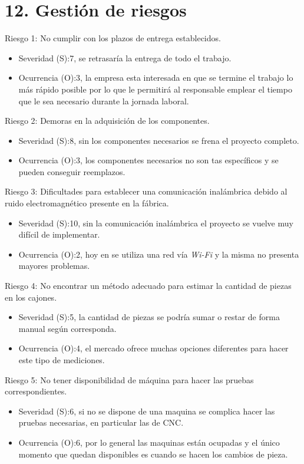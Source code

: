\documentclass[11pt]{charter}
\begin{document}
\section{12. Gestión de riesgos}
\label{sec:riesgos}

Riesgo 1: No cumplir con los plazos de entrega establecidos.
\begin{itemize}
    \item Severidad (S):7, se retrasaría la entrega de todo el trabajo.
    \item Ocurrencia (O):3, la empresa esta interesada en que se termine el trabajo lo más rápido posible por lo que le permitirá al responsable emplear el tiempo que le sea necesario durante la jornada laboral.
\end{itemize}

Riesgo 2: Demoras en la adquisición de los componentes.
\begin{itemize}
    \item Severidad (S):8, sin los componentes necesarios se frena el proyecto completo.
    \item Ocurrencia (O):3, los componentes necesarios no son tas específicos y se pueden conseguir reemplazos. 
\end{itemize}
Riesgo 3: Dificultades para establecer una comunicación inalámbrica debido al ruido electromagnético presente en la fábrica.
\begin{itemize}
    \item Severidad (S):10, sin la comunicación inalámbrica el proyecto se vuelve muy difícil de implementar.  
    \item Ocurrencia (O):2, hoy en se utiliza una red vía \textit{Wi-Fi} y la misma no presenta mayores problemas.
\end{itemize}
Riesgo 4: No encontrar un método adecuado para estimar la cantidad de piezas en los cajones.
\begin{itemize}
    \item Severidad (S):5, la cantidad de piezas se podría sumar o restar de forma manual según corresponda.
    \item Ocurrencia (O):4, el mercado ofrece muchas opciones diferentes para hacer este tipo de mediciones.
\end{itemize}
Riesgo 5: No tener disponibilidad de máquina para hacer las pruebas correspondientes.
\begin{itemize}
    \item Severidad (S):6, si no se dispone de una maquina se complica hacer las pruebas necesarias, en particular las de CNC.
    \item Ocurrencia (O):6, por lo general las maquinas están ocupadas y el único momento que quedan disponibles es cuando se hacen los cambios de pieza.
\end{itemize}
\end{document}

